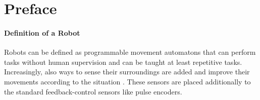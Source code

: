\section{Preface}

\paragraph{Definition of a Robot}
Robots \cite{robotDef} can be defined as programmable movement automatons \cite{automatonDef} that can perform tasks without human supervision and can be taught at least repetitive tasks. 
Increasingly, also ways to sense their surroundings are added and improve their movements according to the situation \cite{robotDef2}. 
These sensors are placed additionally to the standard feedback-control sensors like pulse encoders. %
\medskip


